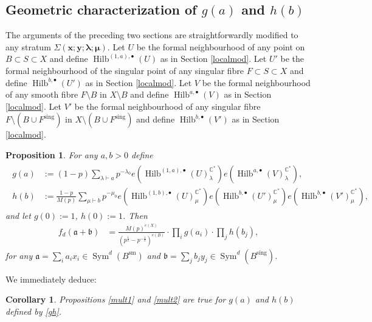 \documentclass{amsart}
\newtheorem{proposition}[theorem]{Proposition}
\newtheorem{corollary}[theorem]{Corollary}
\theoremstyle{definition}
\newcommand{\CC} {\mathbb{C}}          %
\newcommand{\Sym}{\operatorname{Sym}}
\newcommand{\Hilb}{\operatorname{Hilb}}
\newcommand{\sm}{\operatorname{sm}}
\newcommand{\sing}{\operatorname{sing}}
\begin{document}
   
\subsection{Geometric characterization of $g(a)$ and $h(b)$} \label{chargh}

The arguments of the preceding two sections are straightforwardly modified to any stratum $\Sigma(\boldsymbol{x};\boldsymbol{y};\boldsymbol{\lambda};\boldsymbol{\mu})$. Let $U$ be the formal neighbourhood of any point on $B \subset S \subset X$ and define $\Hilb^{(1,a),\bullet}(U)$ as in Section \ref{localmod}. Let $U'$ be the formal neighbourhood of the singular point of any singular fibre $F \subset S \subset X$ and define $\Hilb^{b,\bullet}(U')$ as in Section \ref{localmod}. Let $V$ be the formal neighbourhood of any smooth fibre $F \setminus B$ in $X \setminus B$ and define $\Hilb^{a,\bullet}(V)$ as in Section \ref{localmod}. Let $V'$ be the formal neighbourhood of any singular fibre $F \setminus (B \cup F^{\sing})$ in $X \setminus (B \cup F^{\sing})$ and define $\Hilb^{b,\bullet}(V')$ as in Section \ref{localmod}. 

\begin{proposition} \label{geomgh}
For any $a,b>0$ define
\begin{align}
\begin{split} \label{gh}
g(a) &:= (1-p) \sum_{\lambda \vdash a} p^{-\lambda_0} e(\Hilb^{(1,a),\bullet}(U)_{\lambda}^{\CC^*}) e(\Hilb^{a,\bullet}(V)_{\lambda}^{\CC^*}), \\
h(b) &:= \frac{1-p}{M(p)} \sum_{\mu \vdash b} p^{-\mu_0} e(\Hilb^{(1,b),\bullet}(U)_{\mu}^{\CC^*}) e(\Hilb^{b,\bullet}(U')_{\mu}^{\CC^*}) e(\Hilb^{b,\bullet}(V')_{\mu}^{\CC^*}),
\end{split}
\end{align}
and let $g(0) := 1$, $h(0) :=1$. Then
\begin{align*}
f_{d}(\mathfrak{a} + \mathfrak{b}) &= \frac{M(p)^{e(X)}}{(p^{\frac{1}{2}}-p^{-\frac{1}{2}})^{e(B)}} \cdot \prod_{i} g(a_i) \cdot \prod_{j} h(b_j), 
\end{align*}
for any $\mathfrak{a} = \sum_i a_i x_i \in \Sym^{d}(B^{\sm})$ and $\mathfrak{b} = \sum_j b_j y_j \in \Sym^{d}(B^{\sing})$.
\end{proposition}
   
We immediately deduce:  
\begin{corollary} 
Propositions \ref{mult1} and \ref{mult2} are true for $g(a)$ and $h(b)$ defined by \eqref{gh}.
\end{corollary}   
   
\end{document}
